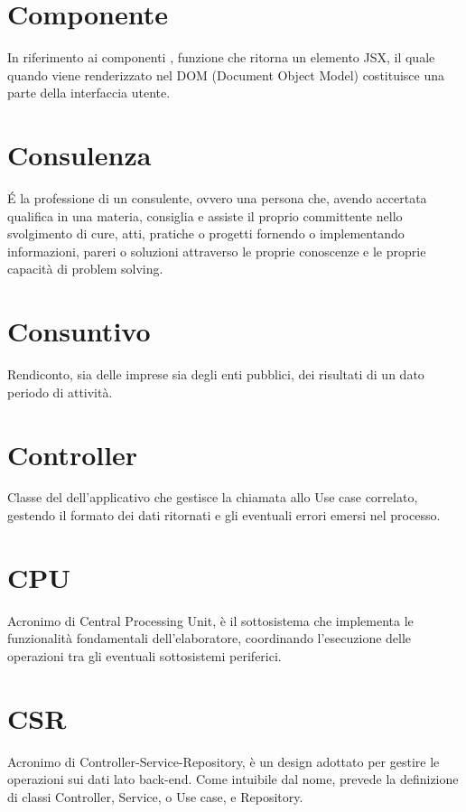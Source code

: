 \section{Componente}\label{sec:Componenti}
In riferimento ai componenti , funzione  che ritorna un elemento JSX, il quale quando viene renderizzato nel DOM (Document Object Model) costituisce una parte della interfaccia utente.

\section{Consulenza}\label{sec:Consulenze}
É la professione di un consulente, ovvero una persona che, avendo accertata qualifica in una materia, consiglia e assiste il proprio committente nello svolgimento di cure, atti, pratiche o progetti fornendo o implementando informazioni, pareri o soluzioni attraverso le proprie conoscenze e le proprie capacità di problem solving.

\section{Consuntivo}\label{sec:Consuntivi}
Rendiconto, sia delle imprese sia degli enti pubblici, dei risultati di un dato periodo di attività.

\section{Controller}\label{sec:Controllers}
Classe del  dell'applicativo che gestisce la chiamata allo Use case correlato, gestendo il formato dei dati ritornati e gli eventuali errori emersi nel processo.

\section{CPU}
Acronimo di Central Processing Unit, è il sottosistema che implementa le funzionalità fondamentali dell'elaboratore, coordinando l'esecuzione delle operazioni tra gli eventuali sottosistemi periferici.

\section{CSR}\label{sec:Controller-Service-Repository}
Acronimo di Controller-Service-Repository, è un design  adottato per gestire le operazioni sui dati lato back-end. Come intuibile dal nome, prevede la definizione di classi Controller, Service, o Use case, e Repository.

